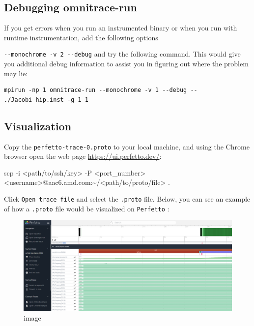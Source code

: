 \documentclass[
]{article}
\let\oldtexttt\texttt
\renewcommand{\texttt}[1]{
  \colorbox{Light}{\oldtexttt{#1}}
}
\newenvironment{Shaded}{}{}
\newcommand{\FunctionTok}[1]{\textcolor[rgb]{0.02,0.16,0.49}{#1}}
\newcommand{\NormalTok}[1]{#1}
\newcommand{\OperatorTok}[1]{\textcolor[rgb]{0.40,0.40,0.40}{#1}}
\begin{document}
\hypertarget{debugging-omnitrace-run}{%
\subsection{Debugging omnitrace-run}\label{debugging-omnitrace-run}}

If you get errors when you run an instrumented binary or when you run
with runtime instrumentation, add the following options
\texttt{-\/-monochrome\ -v\ 2\ -\/-debug} and try the following command.
This would give you additional debug information to assist you in
figuring out where the problem may lie:

\begin{verbatim}
mpirun -np 1 omnitrace-run --monochrome -v 1 --debug -- ./Jacobi_hip.inst -g 1 1
\end{verbatim}

\hypertarget{visualization}{%
\subsection{Visualization}\label{visualization}}

Copy the \texttt{perfetto-trace-0.proto} to your local machine, and
using the Chrome browser open the web page
\url{https://ui.perfetto.dev/}:

\begin{Shaded}
\begin{Highlighting}[]
\FunctionTok{scp}\NormalTok{ {-}i }\OperatorTok{\textless{}}\NormalTok{path/to/ssh/key}\OperatorTok{\textgreater{}}\NormalTok{ {-}P }\OperatorTok{\textless{}}\NormalTok{port\_number}\OperatorTok{\textgreater{}} \OperatorTok{\textless{}}\NormalTok{username}\OperatorTok{\textgreater{}}\NormalTok{@aac6.amd.com:\textasciitilde{}/}\OperatorTok{\textless{}}\NormalTok{path/to/proto/file}\OperatorTok{\textgreater{}}\NormalTok{ .}
\end{Highlighting}
\end{Shaded}

Click \texttt{Open\ trace\ file} and select the \texttt{.proto} file.
Below, you can see an example of how a \texttt{.proto} file would be
visualized on \texttt{Perfetto}:

\begin{figure}
\centering
\includegraphics{omnitrace/6451d7916f1e33bcdf33ec974bc45cc3420c1421.png}
\caption{image}
\end{figure}
\end{document}
